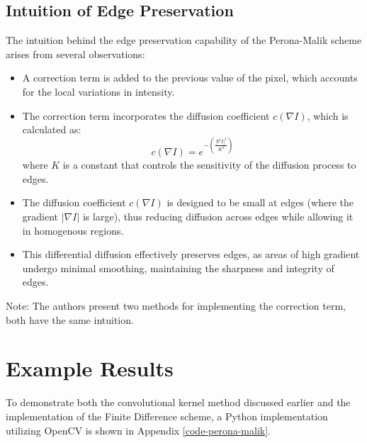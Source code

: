 \documentclass{article}
\begin{document}
\subsection*{Intuition of Edge Preservation}
The intuition behind the edge preservation capability of the Perona-Malik scheme arises from several observations:
\begin{itemize}
	\item A correction term is added to the previous value of the pixel, which accounts for the local variations in intensity.
	\item The correction term incorporates the diffusion coefficient $c(\nabla I)$, which is calculated as:
	\[
	c(\nabla I) = e^{-\left(\frac{|\nabla I|^2}{K^2}\right)}
	\]
	where $K$ is a constant that controls the sensitivity of the diffusion process to edges.
	\item The diffusion coefficient $c(\nabla I)$ is designed to be small at edges (where the gradient $|\nabla I|$ is large), thus reducing diffusion across edges while allowing it in homogenous regions.
	\item This differential diffusion effectively preserves edges, as areas of high gradient undergo minimal smoothing, maintaining the sharpness and integrity of edges.
\end{itemize}
Note: The authors present two methods for implementing the correction term, both have the same intuition.

\section*{Example Results}
To demonstrate both the convolutional kernel method discussed earlier and the implementation of the Finite Difference scheme, a Python implementation utilizing OpenCV is shown in Appendix \ref{code-perona-malik}.
\end{document}
